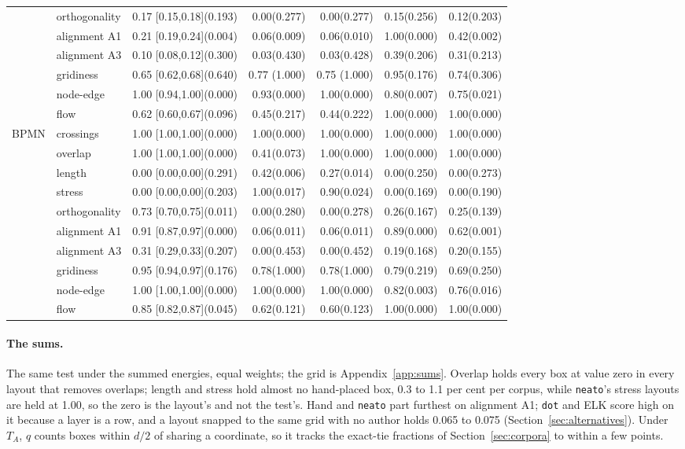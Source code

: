 \documentclass[a4paper,UKenglish]{gd-lipics-v3}
\begin{document}
\begin{center}
\begin{tabular}{llrrrrr}
& orthogonality & 0.17 [0.15,0.18](0.193) & 0.00(0.277) & 0.00(0.277) & 0.15(0.256) & 0.12(0.203) \\
& alignment A1 & 0.21 [0.19,0.24](0.004) & 0.06(0.009) & 0.06(0.010) & 1.00(0.000) & 0.42(0.002) \\
& alignment A3 & 0.10 [0.08,0.12](0.300) & 0.03(0.430) & 0.03(0.428) & 0.39(0.206) & 0.31(0.213) \\
& gridiness & 0.65 [0.62,0.68](0.640) & 0.77 (1.000) & 0.75 (1.000) & 0.95(0.176) & 0.74(0.306) \\
& node-edge & 1.00 [0.94,1.00](0.000) & 0.93(0.000) & 1.00(0.000) & 0.80(0.007) & 0.75(0.021) \\
& flow & 0.62 [0.60,0.67](0.096) & 0.45(0.217) & 0.44(0.222) & 1.00(0.000) & 1.00(0.000) \\
\midrule
BPMN & crossings & 1.00 [1.00,1.00](0.000) & 1.00(0.000) & 1.00(0.000) & 1.00(0.000) & 1.00(0.000) \\
& overlap & 1.00 [1.00,1.00](0.000) & 0.41(0.073) & 1.00(0.000) & 1.00(0.000) & 1.00(0.000) \\
& length & 0.00 [0.00,0.00](0.291) & 0.42(0.006) & 0.27(0.014) & 0.00(0.250) & 0.00(0.273) \\
& stress & 0.00 [0.00,0.00](0.203) & 1.00(0.017) & 0.90(0.024) & 0.00(0.169) & 0.00(0.190) \\
& orthogonality & 0.73 [0.70,0.75](0.011) & 0.00(0.280) & 0.00(0.278) & 0.26(0.167) & 0.25(0.139) \\
& alignment A1 & 0.91 [0.87,0.97](0.000) & 0.06(0.011) & 0.06(0.011) & 0.89(0.000) & 0.62(0.001) \\
& alignment A3 & 0.31 [0.29,0.33](0.207) & 0.00(0.453) & 0.00(0.452) & 0.19(0.168) & 0.20(0.155) \\
& gridiness & 0.95 [0.94,0.97](0.176) & 0.78(1.000) & 0.78(1.000) & 0.79(0.219) & 0.69(0.250) \\
& node-edge & 1.00 [1.00,1.00](0.000) & 1.00(0.000) & 1.00(0.000) & 0.82(0.003) & 0.76(0.016) \\
& flow & 0.85 [0.82,0.87](0.045) & 0.62(0.121) & 0.60(0.123) & 1.00(0.000) & 1.00(0.000) \\
\bottomrule
\end{tabular}
\end{center}

\paragraph{The sums.} The same test under the summed energies, equal weights; the grid
is Appendix~\ref{app:sums}. Overlap holds every box at value zero in every layout that
removes overlaps; length and stress hold almost no hand-placed box, 0.3 to 1.1 per cent
per corpus, while \texttt{neato}'s stress layouts are held at 1.00, so the zero is the
layout's and not the test's. Hand and \texttt{neato} part furthest on alignment A1;
\texttt{dot} and ELK score high on it because a layer is a row, and a layout snapped to
the same grid with no author holds 0.065 to 0.075 (Section~\ref{sec:alternatives}).
Under $T_A$, $q$ counts boxes within $d/2$ of sharing a coordinate, so it tracks the
exact-tie fractions of Section~\ref{sec:corpora} to within a few points.
\end{document}
